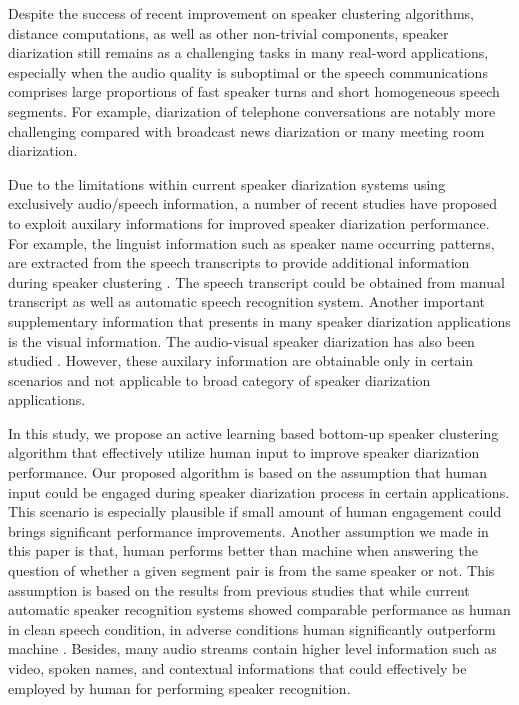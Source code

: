 \documentclass[journal,10pt]{IEEEtran}
\begin{document}
Despite the success of recent improvement on speaker clustering algorithms, distance computations, as well as other non-trivial components, speaker diarization still remains as a challenging tasks in many real-word applications, especially when the audio quality is suboptimal or the speech communications comprises large proportions of fast speaker turns and short homogeneous speech segments. For example, diarization of telephone conversations are notably more challenging compared with broadcast news diarization or many meeting room diarization. 

Due to the limitations within current speaker diarization systems using exclusively audio/speech information, a number of recent studies have proposed to exploit auxilary informations for improved speaker diarization performance. For example, the linguist information such as speaker name occurring patterns, are extracted from the speech transcripts to provide additional information during speaker clustering \cite{canseco2004speaker}. The speech transcript could be obtained from manual transcript as well as automatic speech recognition system. Another important supplementary information that presents in many speaker diarization applications is the visual information. The audio-visual speaker diarization has also been studied \cite{friedland2009multi,noulas2012multimodal}. However, these auxilary information are obtainable only in certain scenarios and not applicable to broad category of speaker diarization applications.

In this study, we propose an active learning based bottom-up speaker clustering algorithm that effectively utilize human input to improve speaker diarization performance. Our proposed algorithm is based on the assumption that human input could be engaged during speaker diarization process in certain applications. This scenario is especially plausible if small amount of human engagement could brings significant performance improvements. Another assumption we made in this paper is that, human performs better than machine when answering the question of whether a given segment pair is from the same speaker or not. This assumption is based on the results from previous studies that while current automatic speaker recognition systems showed comparable performance as human in clean speech condition, in adverse conditions human significantly outperform machine \cite{wenndt2012machine,schmidt1998human}. Besides, many audio streams contain higher level information such as video, spoken names, and contextual informations that could effectively be employed by human for performing speaker recognition.
\end{document}
